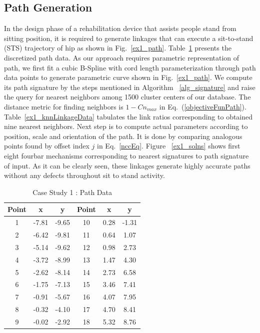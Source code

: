 \documentclass[twocolumn,10pt]{asme2e}
\newcommand{\req}[1]{(\ref{#1})}
\begin{document}
\subsection{Path Generation}
In the design phase of a rehabilitation device that assists people stand from sitting position, it is required to generate linkages that can execute a sit-to-stand (STS) trajectory of hip as shown in Fig.~\ref{ex1_path}.
Table~\ref{hipPathTab} presents the discretized path data.
As our approach requires parametric representation of path, we first fit a cubic B-Spline with cord length parameterization through path data points to generate parametric curve shown in Fig.~\ref{ex1_path}.
We compute its path signature by the steps mentioned in Algorithm ~\ref{alg_signature} and raise the query for nearest neighbors among 1500 cluster centers of our database.
The distance metric for finding neighbors is $1-Cn_{max}$ in Eq.~\req{objectiveFunPath}.
Table~\ref{ex1_knnLinkageData} tabulates the link ratios corresponding to obtained nine nearest neighbors.
Next step is to compute actual parameters according to position, scale and orientation of the path.
It is done by comparing analogous points found by offset index $j$ in Eq.~\ref{nccEq}.
Figure ~\ref{ex1_solns} shows first eight fourbar mechanisms corresponding to nearest signatures to path signature of input.
As it can be clearly seen, these linkages generate highly accurate paths without any defects throughout sit to stand activity.

\begin{table}
\caption{Case Study 1 : Path Data}
\centering
\label{hipPathTab}
\begin{tabular}{cccccc}
\hline
Point & x & y & Point & x & y \\
\hline
1 & -7.81 & -9.65 & 10 & 0.28 & -1.31 \\
2 & -6.42 & -9.81 & 11 & 0.64 & 1.07 \\
3 & -5.14 & -9.62 & 12 & 0.98 & 2.73 \\
4 & -3.72 & -8.99 & 13 & 1.47 & 4.30 \\
5 & -2.62 & -8.14 & 14 & 2.73 & 6.58 \\
6 & -1.75 & -7.13 & 15 & 3.46 & 7.41 \\
7 & -0.91 & -5.67 & 16 & 4.07 & 7.95 \\
8 & -0.32 & -4.10 & 17 & 4.70 & 8.41 \\
9 & -0.02 & -2.92 & 18 & 5.32 & 8.76 \\
\end{tabular}
\end{table}
\end{document}

